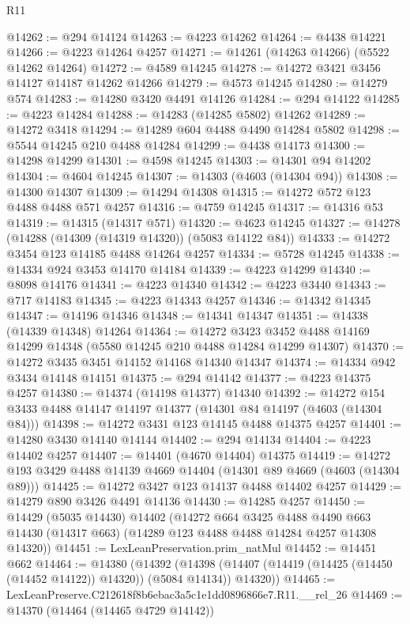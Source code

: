\begin{lexlean}{R11}
\begin{coremodule}
@14262 := @294 @14124
@14263 := @4223 @14262
@14264 := @4438 @14221
@14266 := @4223 @14264 @4257
@14271 := @14261 (@14263 @14266) (@5522 @14262 @14264)
@14272 := @4589 @14245
@14278 := @14272 @3421 @3456 @14127 @14187 @14262 @14266
@14279 := @4573 @14245
@14280 := @14279 @574
@14283 := @14280 @3420 @4491 @14126
@14284 := @294 @14122
@14285 := @4223 @14284
@14288 := @14283 (@14285 @5802) @14262
@14289 := @14272 @3418
@14294 := @14289 @604 @4488 @4490 @14284 @5802
@14298 := @5544 @14245 @210 @4488 @14284
@14299 := @4438 @14173
@14300 := @14298 @14299
@14301 := @4598 @14245
@14303 := @14301 @94 @14202
@14304 := @4604 @14245
@14307 := @14303 (@4603 (@14304 @94))
@14308 := @14300 @14307
@14309 := @14294 @14308
@14315 := @14272 @572 @123 @4488 @4488 @571 @4257
@14316 := @4759 @14245
@14317 := @14316 @53
@14319 := @14315 (@14317 @571)
@14320 := @4623 @14245
@14327 := @14278 (@14288 (@14309 (@14319 @14320)) (@5083 @14122 @84))
@14333 := @14272 @3454 @123 @14185 @4488 @14264 @4257
@14334 := @5728 @14245
@14338 := @14334 @924 @3453 @14170 @14184
@14339 := @4223 @14299
@14340 := @8098 @14176
@14341 := @4223 @14340
@14342 := @4223 @3440
@14343 := @717 @14183
@14345 := @4223 @14343 @4257
@14346 := @14342 @14345
@14347 := @14196 @14346
@14348 := @14341 @14347
@14351 := @14338 (@14339 @14348) @14264
@14364 := @14272
    @3423
    @3452
    @4488
    @14169
    @14299
    @14348
    (@5580 @14245 @210 @4488 @14284 @14299 @14307)
@14370 := @14272 @3435 @3451 @14152 @14168 @14340 @14347
@14374 := @14334 @942 @3434 @14148 @14151
@14375 := @294 @14142
@14377 := @4223 @14375 @4257
@14380 := @14374 (@14198 @14377) @14340
@14392 := @14272 @154 @3433 @4488 @14147 @14197 @14377 (@14301 @84 @14197 (@4603 (@14304 @84)))
@14398 := @14272 @3431 @123 @14145 @4488 @14375 @4257
@14401 := @14280 @3430 @14140 @14144
@14402 := @294 @14134
@14404 := @4223 @14402 @4257
@14407 := @14401 (@4670 @14404) @14375
@14419 := @14272 @193 @3429 @4488 @14139 @4669 @14404 (@14301 @89 @4669 (@4603 (@14304 @89)))
@14425 := @14272 @3427 @123 @14137 @4488 @14402 @4257
@14429 := @14279 @890 @3426 @4491 @14136
@14430 := @14285 @4257
@14450 := @14429
    (@5035 @14430)
    @14402
    (@14272
      @664
      @3425
      @4488
      @4490
      @663
      @14430
      (@14317 @663)
      (@14289 @123 @4488 @4488 @14284 @4257 @14308 @14320))
@14451 := LexLeanPreservation.prim_natMul
@14452 := @14451 @662
@14464 := @14380
    (@14392
      (@14398 (@14407 (@14419 (@14425 (@14450 (@14452 @14122)) @14320)) (@5084 @14134)) @14320))
@14465 := LexLeanPreserve.C212618f8b6ebac3a5c1e1dd0896866e7.R11.__rel_26
@14469 := @14370 (@14464 (@14465 @4729 @14142))

\end{coremodule}
\end{lexlean}

